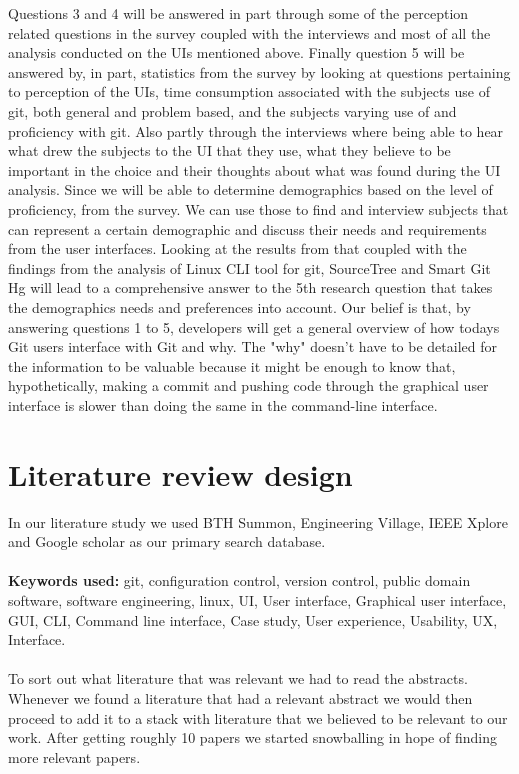 \documentclass[a4paper,oneside]{bth} %
\begin{document}
			Questions 3 and 4 will be answered in part through some of the perception related questions in the survey coupled with the interviews and most of all the analysis conducted on the UIs mentioned above. Finally question 5 will be answered by, in part, statistics from the survey by looking at questions pertaining to perception of the UIs, time consumption associated with the subjects use of git, both general and problem based, and the subjects varying use of and proficiency with git. Also partly through the interviews where being able to hear what drew the subjects to the UI that they use, what they believe to be important in the choice and their thoughts about what was found during the UI analysis. Since we will be able to determine demographics based on the level of proficiency, from the survey. We can use those to find and interview subjects that can represent a certain demographic and discuss their needs and requirements from the user interfaces. Looking at the results from that coupled with the findings from the analysis of Linux CLI tool for git, SourceTree and Smart Git Hg will lead to a comprehensive answer to the 5th research question that takes the demographics needs and preferences into account.  
			Our belief is that, by answering questions 1 to 5, developers will get a general overview of how todays Git users interface with Git and why. The "why" doesn't have to be detailed for the information to be valuable because it might be enough to know that, hypothetically, making a commit and pushing code through the graphical user interface is slower than doing the same in the command-line interface.  
		 
			\section{Literature review design}
			In our literature study we used BTH Summon, Engineering Village, IEEE Xplore and Google scholar as our primary search database.\\\\
			\textbf{Keywords used:} git, configuration control, version control, public domain software, software engineering, linux, UI, User interface, Graphical user interface, GUI, CLI, Command line interface, Case study, User experience, Usability, UX, Interface.
			\\\\
			To sort out what literature that was relevant we had to read the abstracts.
			Whenever we found a literature that had a relevant abstract we would then proceed to add it to a stack with literature that we believed to be relevant to our work.
			After getting roughly 10 papers we started snowballing in hope of finding more relevant papers.
			
\end{document}
